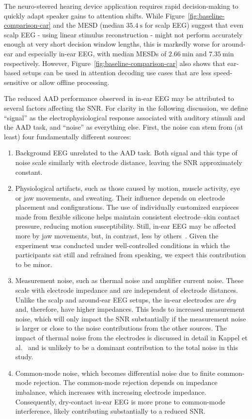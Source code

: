 \documentclass[fleqn,10pt]{wlscirep}
\begin{document}
	The neuro-steered hearing device application requires rapid decision-making to quickly adapt speaker gains to attention shifts. While Figure~\ref{fig:baseline-comparison-car} and the MESD (median $\SI{35.4}{\second}$ for scalp EEG) suggest that even scalp EEG - using linear stimulus reconstruction - might not perform accurately enough at very short decision window lengths, this is markedly worse for around-ear and especially in-ear EEG, with median MESDs of $\SI{2.66}{\minute}$ and $\SI{7.35}{\minute}$ respectively. However, Figure~\ref{fig:baseline-comparison-car} also shows that ear-based setups can be used in attention decoding use cases that are less speed-sensitive or allow offline processing.
	
	The reduced AAD performance observed in in-ear EEG may be attributed to several factors affecting the SNR. For clarity in the following discussion, we define “signal” as the electrophysiological response associated with auditory stimuli and the AAD task, and “noise” as everything else. First, the noise can stem from (at least) four fundamentally different sources: 
	\begin{enumerate}
		\item Background EEG unrelated to the AAD task. Both signal and this type of noise scale similarly with electrode distance, leaving the SNR approximately constant.
		\item Physiological artifacts, such as those caused by motion, muscle activity, eye or jaw movements, and sweating. Their influence depends on electrode placement and configurations. The use of individually customized earpieces made from flexible silicone helps maintain consistent electrode–skin contact pressure, reducing motion susceptibility. Still, in-ear EEG may be affected more by jaw movements, but, in contrast, less by others~\cite{kappel2017physiological}. Given the experiment was conducted under well-controlled conditions in which the participants sat still and refrained from speaking, we expect this contribution to be minor.
		\item Measurement noise, such as thermal noise and amplifier current noise. These scale with electrode impedance and are independent of electrode distances. Unlike the scalp and around-ear EEG setups, the in-ear electrodes are \emph{dry} and, therefore, have higher impedances. This leads to increased measurement noise, which will only impact the SNR substantially if the measurement noise is larger or close to the noise contributions from the other sources. The impact of thermal noise from the electrodes is discussed in detail in Kappel et al.~\cite{kappel2022characterization} and is unlikely to be a dominant contribution to the total noise in this study.
		\item Common-mode noise, which becomes differential noise due to finite common-mode rejection. The common-mode rejection depends on impedance imbalance, which increases with increasing electrode impedance. Consequently, dry-contact in-ear EEG is more prone to common-mode interference, likely contributing substantially to a reduced SNR. 
	\end{enumerate}
\end{document}
